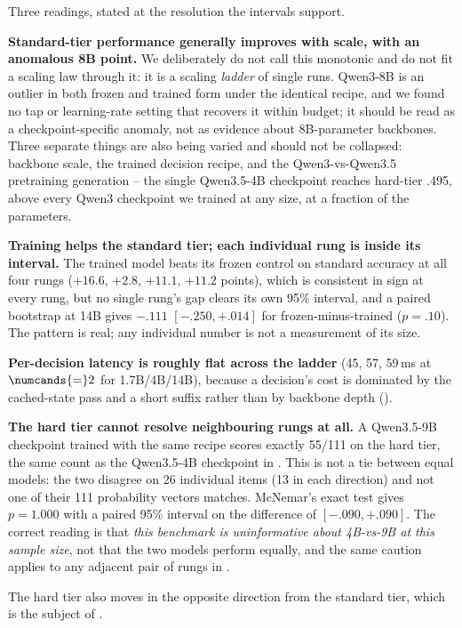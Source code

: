 Three readings, stated at the resolution the intervals support.

\textbf{Standard-tier performance generally improves with scale, with an anomalous 8B point.} We
deliberately do not call this monotonic and do not fit a scaling law through it: it is a scaling
\emph{ladder} of single runs. Qwen3-8B is an outlier in both frozen and trained form under the
identical recipe, and we found no tap or learning-rate setting that recovers it within budget; it should
be read as a checkpoint-specific anomaly, not as evidence about 8B-parameter backbones. Three separate
things are also being varied and should not be collapsed: backbone scale, the trained decision recipe,
and the Qwen3-vs-Qwen3.5 pretraining generation -- the single Qwen3.5-4B checkpoint reaches hard-tier
.495, above every Qwen3 checkpoint we trained at any size, at a fraction of the parameters.

\textbf{Training helps the standard tier; each individual rung is inside its interval.} The trained
model beats its frozen control on standard accuracy at all four rungs ($+16.6$, $+2.8$, $+11.1$, $+11.2$
points), which is consistent in sign at every rung, but no single rung's gap clears its own 95\%
interval, and a paired bootstrap at 14B gives $-.111$ $[-.250, +.014]$ for frozen-minus-trained
($p{=}.10$). The pattern is real; any individual number is not a measurement of its size.

\textbf{Per-decision latency is roughly flat across the ladder} (45, 57, 59\,ms at $\numcands{=}2$ for
1.7B/4B/14B), because a decision's cost is dominated by the cached-state pass and a short suffix rather
than by backbone depth ().

\textbf{The hard tier cannot resolve neighbouring rungs at all.} A Qwen3.5-9B checkpoint trained with
the same recipe scores exactly 55/111 on the hard tier, the same count as the Qwen3.5-4B checkpoint in
. This is not a tie between equal models: the two disagree on 26 individual items
(13 in each direction) and not one of their 111 probability vectors matches. McNemar's exact test gives
$p = 1.000$ with a paired 95\% interval on the difference of $[-.090, +.090]$. The correct reading is
that \emph{this benchmark is uninformative about 4B-vs-9B at this sample size}, not that the two models
perform equally, and the same caution applies to any adjacent pair of rungs in .

The hard tier also moves in the opposite direction from the standard tier, which is the subject of
.

